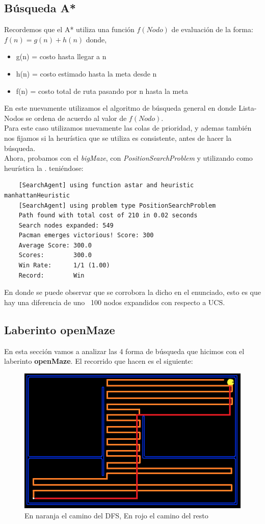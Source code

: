 \documentclass[12pt, titlepage, a4paper]{article}
\begin{document}
\subsection{Búsqueda A*}
Recordemos que el A* utiliza una función $f(Nodo)$ de 
evaluación de la forma: $f(n) = g(n) + h(n)$ donde,
\begin{itemize}
    \item {g(n) = costo hasta llegar a n}
    \item {h(n) = costo estimado hasta la meta desde n}
    \item {f(n) = costo total de ruta pasando por n hasta la meta}
\end{itemize}

En este nuevamente utilizamos el algoritmo 
de búsqueda general 
en donde Lista-Nodos se ordena de
acuerdo al valor de $f(Nodo)$.\\

Para este caso utilizamos nuevamente las colas de prioridad, y ademas también nos 
fijamos si la heurística que se utiliza es consistente, antes de hacer la búsqueda.\\

Ahora, probamos con el \textit{bigMaze}, con \textit{PositionSearchProblem} y
 utilizando como heurística la .
teniéndose: 
\begin{verbatim}
    [SearchAgent] using function astar and heuristic manhattanHeuristic
    [SearchAgent] using problem type PositionSearchProblem
    Path found with total cost of 210 in 0.02 seconds
    Search nodes expanded: 549
    Pacman emerges victorious! Score: 300
    Average Score: 300.0
    Scores:        300.0
    Win Rate:      1/1 (1.00)
    Record:        Win
\end{verbatim}

En donde se puede observar que se corrobora la dicho en el enunciado, esto 
es que hay una diferencia de uno ~100 nodos expandidos con respecto a UCS.

\subsection{Laberinto openMaze}
En esta sección vamos a analizar las 4 forma de búsqueda que hicimos con 
el laberinto \textbf{openMaze}. El recorrido que hacen es el siguiente:

\begin{figure}[H]
    \centering
    \includegraphics[width=.6\textwidth]{Imagenes/caminos.png}
    \caption{En naranja el camino del DFS, En rojo el camino del resto}
\end{figure}
\end{document}
